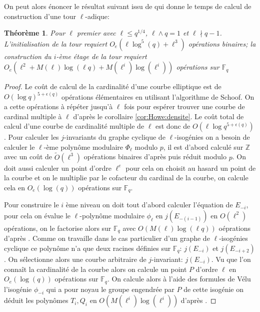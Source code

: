 \documentclass[10pt,a4paper]{book}
\theoremstyle{plain}
\newtheorem{thm}{Théorème}
\theoremstyle{definition}
\theoremstyle{definition}
\theoremstyle{definition}
\theoremstyle{definition}
\theoremstyle{remark}
\theoremstyle{remark}
\begin{document}
On peut alors énoncer le résultat suivant issu de \cite{DeFeo-Doliskani-Schost13} qui donne le temps de calcul de construction d'une tour $\ell$-adique:

\begin{thm}
Pour $\ell$ premier avec $\ell \leqslant q^{1/4}$, $\ell \wedge q = 1$ et $\ell \nmid q-1$. L'initialisation de la tour requiert $O_e(\ell \log^5(q)+\ell^3)$ opérations binaires; la construction du $i$-ème étage de la tour requiert $O_e(\ell^2+M(\ell)\log(\ell q)+M(\ell^i)\log(\ell^i))$ opérations sur $\mathbb{F}_q$
\end{thm} 

\begin{proof}
Le coût de calcul de la cardinalité d'une courbe elliptique est de $O(\log q)^{5+\epsilon(q)}$ opérations élémentaires en utilisant l'algorithme de Schoof. On a cette opérations à répéter jusqu'à $\ell$ fois pour espérer trouver une courbe de cardinal multiple à $\ell$ d'après le corollaire \ref{cor:Howe:densite}. Le coût total de calcul d'une courbe de cardinalité multiple de $\ell$ est donc de  $O(\ell\log q^{5+\epsilon(q)})$. Pour calculer les $j$-invariants du graphe cyclique de $\ell$-isogénies on a besoin de calculer le $\ell$-ème polynôme modulaire $\Phi_{\ell}$ modulo $p$, il est d'abord calculé sur $\mathbb{Z}$ avec un coût de $\tilde{O}(\ell^3)$ opérations binaires d'après \cite{enge2008} puis réduit modulo $p$. On doit aussi calculer un point d'ordre $\ell^e$ pour cela on choisit au hasard un point de la courbe et on le multiplie par le cofacteur du cardinal de la courbe, on calcule cela en $O_{e}(\log(q))$ opérations sur $\mathbb{F}_q$.

Pour construire le $i$ ème niveau on doit tout d'abord calculer l'équation de $E_{-i}$, pour cela on évalue le $\ell$-polynôme modulaire $\phi_{\ell}$ en $j(E_{-(i-1)})$ en $O(\ell^2)$ opérations, on le factorise alors sur $\mathbb{F}_q$ avec $O(M(\ell)\log(\ell q))$ oéprations d'après \cite[Ch.14]{vzGJG03}. Comme on travaille dans le cas particulier d'un graphe de $\ell$-isogénies cyclique ce polynôme n'a que deux racines définies sur $\mathbb{F}_q$: $j(E_{-i})$ et $j(E_{-i+2})$. On sélectionne alors une courbe arbitraire de $j$-invariant: $j(E_{-i})$. Vu que l'on connaît la cardinalité de la courbe alors on calcule un point $P$ d'ordre $\ell$ en $O_{e}(\log(q))$ opérations sur $\mathbb{F}_q$. On calcule alors à l'aide des formules de Vélu l'isogénie $\phi_{-i}$ qui a pour noyau le groupe engendrée par $P$ de cette isogénie on déduit les polynômes $T_{i},Q_{i}$ en $O(M(\ell^i)\log(\ell^i))$ d'après \cite[Algorithme 1]{DeFeo-Doliskani-Schost13}.
\end{proof}
\end{document}
